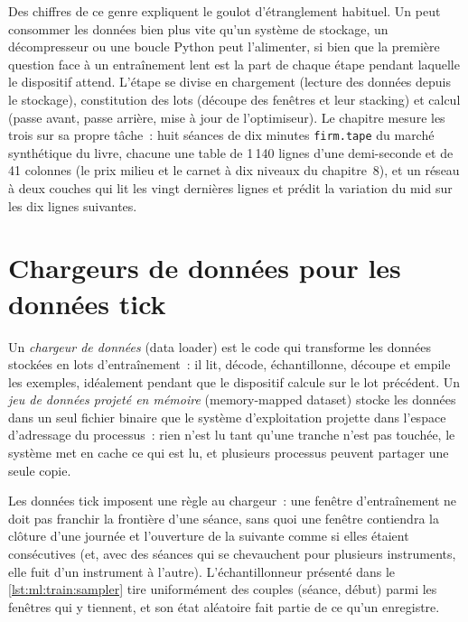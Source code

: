 Des chiffres de ce genre expliquent le goulot d'étranglement habituel. Un  peut consommer les données bien plus vite qu'un système de stockage, un
décompresseur ou une boucle Python peut l'alimenter, si bien que la première question face à un entraînement lent est la part de chaque étape pendant laquelle
le dispositif attend. L'étape se divise en chargement (lecture des données depuis le stockage), constitution des lots (découpe des fenêtres et leur stacking) et
calcul (passe avant, passe arrière, mise à jour de l'optimiseur). Le chapitre mesure les trois sur sa propre tâche~: huit
séances de dix minutes \texttt{firm.tape} du marché synthétique du livre, chacune une table de 1\,140 lignes d'une demi-seconde et de 41 colonnes (le
prix milieu et le carnet à dix niveaux du chapitre~8), et un réseau à deux couches qui lit les vingt dernières lignes et prédit la
variation du mid sur les dix lignes suivantes.

\section{Chargeurs de données pour les données tick}

\begin{definition}\label{def:ml:training-infrastructure:loader}
Un \emph{chargeur de données} (data loader) est le code qui transforme les données stockées en lots d'entraînement~: il lit, décode, échantillonne,
découpe et empile les exemples, idéalement pendant que le dispositif calcule sur le lot précédent. Un \emph{jeu de données
projeté en mémoire} (memory-mapped dataset) stocke les données dans un seul fichier binaire que le système d'exploitation projette dans l'espace
d'adressage du processus~: rien n'est lu tant qu'une tranche n'est pas touchée, le système met en cache ce qui est lu, et plusieurs processus peuvent
partager une seule copie.
\end{definition}

Les données tick imposent une règle au chargeur~: une fenêtre d'entraînement ne doit pas franchir la frontière d'une séance, sans quoi une fenêtre contiendra la
clôture d'une journée et l'ouverture de la suivante comme si elles étaient consécutives (et, avec des séances qui se chevauchent pour plusieurs instruments,
elle fuit d'un instrument à l'autre). L'échantillonneur présenté dans le \cref{lst:ml:train:sampler} tire
uniformément des couples (séance, début) parmi les fenêtres qui y tiennent, et son état aléatoire fait partie de ce qu'un  enregistre.

